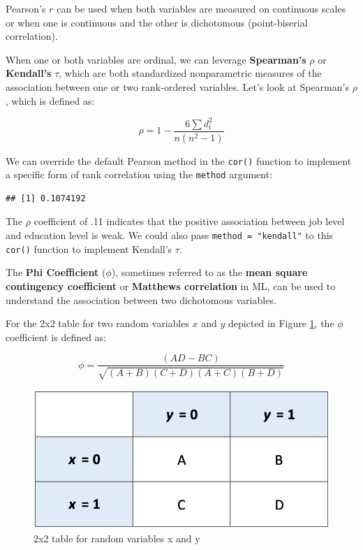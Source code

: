 \documentclass[
]{book}
\newenvironment{Shaded}{\begin{snugshade}}{\end{snugshade}}
\newcommand{\AttributeTok}[1]{\textcolor[rgb]{0.77,0.63,0.00}{#1}}
\newcommand{\CommentTok}[1]{\textcolor[rgb]{0.56,0.35,0.01}{\textit{#1}}}
\newcommand{\FunctionTok}[1]{\textcolor[rgb]{0.00,0.00,0.00}{#1}}
\newcommand{\NormalTok}[1]{#1}
\newcommand{\SpecialCharTok}[1]{\textcolor[rgb]{0.00,0.00,0.00}{#1}}
\newcommand{\StringTok}[1]{\textcolor[rgb]{0.31,0.60,0.02}{#1}}
\begin{document}
Pearson's \(r\) can be used when both variables are measured on continuous scales or when one is continuous and the other is dichotomous (point-biserial correlation).

When one or both variables are ordinal, we can leverage \textbf{Spearman's} \(\rho\) or \textbf{Kendall's} \(\tau\), which are both standardized nonparametric measures of the association between one or two rank-ordered variables. Let's look at Spearman's \(\rho\), which is defined as:

\[ \rho = 1 - {\frac {6 \sum d_i^2}{n(n^2 - 1)}} \]

We can override the default Pearson method in the \texttt{cor()} function to implement a specific form of rank correlation using the \texttt{method} argument:

\begin{Shaded}
\end{Shaded}

\begin{verbatim}
## [1] 0.1074192
\end{verbatim}

The \(\rho\) coefficient of .11 indicates that the positive association between job level and education level is weak. We could also pass \texttt{method\ =\ "kendall"} to this \texttt{cor()} function to implement Kendall's \(\tau\).

The \textbf{Phi Coefficient} (\(\phi\)), sometimes referred to as the \textbf{mean square contingency coefficient} or \textbf{Matthews correlation} in ML, can be used to understand the association between two dichotomous variables.

For the 2x2 table for two random variables \(x\) and \(y\) depicted in Figure \ref{fig:phi-tbl}, the \(\phi\) coefficient is defined as:

\[ \phi = {\frac {(AD-BC)}{\sqrt{(A+B)(C+D)(A+C)(B+D)}}} \]

\begin{figure}

{\centering \includegraphics[width=0.5\linewidth]{graphics/phi_coefficient_formula} 

}

\caption{2x2 table for random variables x and y}\label{fig:phi-tbl}
\end{figure}
\end{document}
